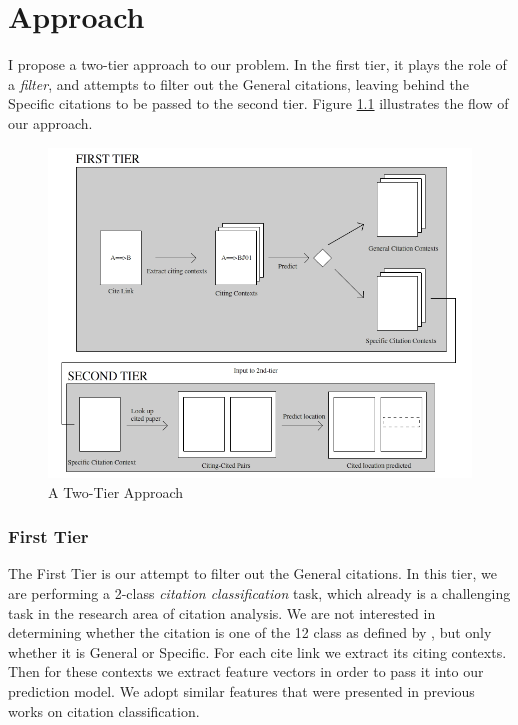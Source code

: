 \chapter{Approach}
\label{approach}
I propose a two-tier approach to our problem. In the first tier, it plays the role of a \textit{filter}, and attempts to filter out the General citations, leaving behind the Specific citations to be passed to the second tier. Figure \ref{fig:twotier} illustrates the flow of our approach.
\begin{figure}[h]
  \centering
  \includegraphics[scale=0.60]{./twotier}
  \caption{A Two-Tier Approach}
  \label{fig:twotier}
\end{figure}

\subsection{First Tier}
The First Tier is our attempt to filter out the General citations. In this tier, we are performing a 2-class \textit{citation classification} task, which already is a challenging task in the research area of citation analysis. We are not interested in determining whether the citation is one of the 12 class as defined by \cite{teufel2009annotation}, but only whether it is General or Specific. For each cite link we extract its citing contexts. Then for these contexts we extract feature vectors in order to pass it into our prediction model. We adopt similar features that were presented in previous works on citation classification.

